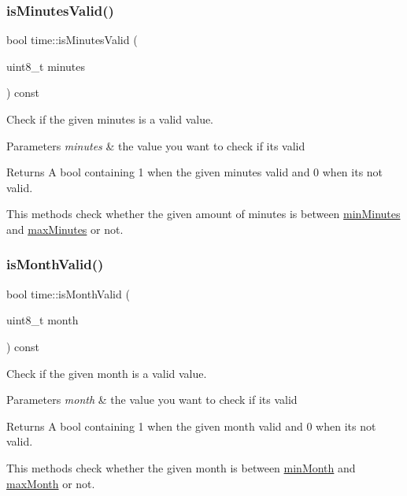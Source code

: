 \subsubsection{\texorpdfstring{is\+Minutes\+Valid()}{isMinutesValid()}}
{\footnotesize\ttfamily bool time\+::is\+Minutes\+Valid (\begin{DoxyParamCaption}\item[{uint8\+\_\+t}]{minutes }\end{DoxyParamCaption}) const}



Check if the given minutes is a valid value. 


\begin{DoxyParams}{Parameters}
{\em minutes} & the value you want to check if it\textquotesingle{}s valid \\
\hline
\end{DoxyParams}
\begin{DoxyReturn}{Returns}
A bool containing 1 when the given minutes valid and 0 when it\textquotesingle{}s not valid.
\end{DoxyReturn}
This methods check whether the given amount of minutes is between \mbox{\hyperlink{}{min\+Minutes}} and \mbox{\hyperlink{}{max\+Minutes}} or not. \mbox{\label{classtime_a92c265ce96b24f9bdfa960144a0bce11}} 
\subsubsection{\texorpdfstring{is\+Month\+Valid()}{isMonthValid()}}
{\footnotesize\ttfamily bool time\+::is\+Month\+Valid (\begin{DoxyParamCaption}\item[{uint8\+\_\+t}]{month }\end{DoxyParamCaption}) const}



Check if the given month is a valid value. 


\begin{DoxyParams}{Parameters}
{\em month} & the value you want to check if it\textquotesingle{}s valid \\
\hline
\end{DoxyParams}
\begin{DoxyReturn}{Returns}
A bool containing 1 when the given month valid and 0 when it\textquotesingle{}s not valid.
\end{DoxyReturn}
This methods check whether the given month is between \mbox{\hyperlink{}{min\+Month}} and \mbox{\hyperlink{}{max\+Month}} or not. \mbox{\label{classtime_aeba296b9c9c6ec09250f98a20062a500}} 
